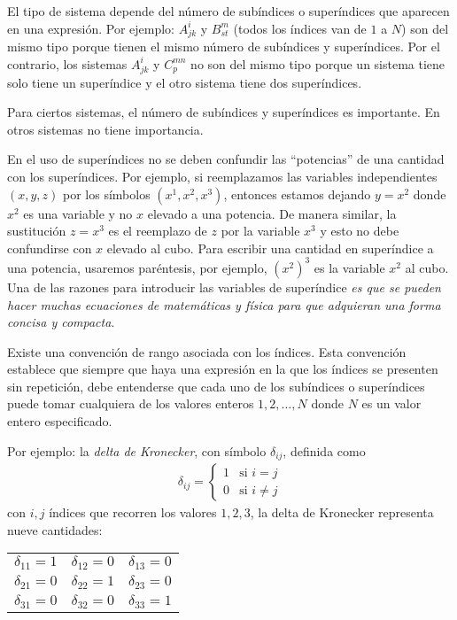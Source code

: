 \par
El tipo de sistema depende del número de subíndices o superíndices que aparecen en una expresión. Por ejemplo: $A_{jk}^{i}$ y $B_{st}^{m}$ (todos los índices van de $1$ a $N$) son del mismo tipo porque tienen el mismo número de subíndices y superíndices. Por el contrario, los sistemas $A_{jk}^{i}$ y $C_{p}^{mn}$ no son del mismo tipo porque un sistema tiene solo tiene un superíndice y el otro sistema tiene dos superíndices.
\par
Para ciertos sistemas, el número de subíndices y superíndices es importante. En otros sistemas no tiene importancia.
\par
En el uso de superíndices no se deben confundir las \enquote{potencias} de una cantidad con los superíndices. Por ejemplo, si reemplazamos las variables independientes $(x, y, z)$ por los símbolos $(x^{1}, x^{2}, x^{3})$, entonces estamos dejando $y = x^{2}$ donde $x^{2}$ es una variable y no $x$ elevado a una potencia. De manera similar, la sustitución $z = x^{3}$ es el reemplazo de $z$ por la variable $x^{3}$ y esto no debe confundirse con $x$ elevado al cubo. Para escribir una cantidad en superíndice a una potencia, usaremos paréntesis, por ejemplo, $(x^{2})^{3}$ es la variable $x^{2}$ al cubo. Una de las razones para introducir las variables de superíndice \emph{es que se pueden hacer muchas ecuaciones de matemáticas y física para que adquieran una forma concisa y compacta}.
\par
Existe una convención de rango asociada con los índices. Esta convención establece que siempre que haya una expresión en la que los índices se presenten sin repetición, debe entenderse que cada uno de los subíndices o superíndices puede tomar cualquiera de los valores enteros $1,2, \ldots, N$ donde $N$ es un valor entero especificado.
\par
Por ejemplo: la \emph{delta de Kronecker}, con símbolo $\delta_{ij}$, definida como
\begin{align*}
\delta_{ij} = \begin{cases}
1 & \mbox{si } i = j \\[0.5em]
0 & \mbox{si } i \neq j
\end{cases}
\end{align*}
con $i, j$ índices que recorren los valores $1, 2, 3$, la delta de Kronecker representa nueve cantidades:
\begin{table}[H]
\centering
\begin{tabular}{c c c}
$\delta_{11} = 1$ & $\delta_{12} = 0$ & $\delta_{13} = 0$ \\
$\delta_{21} = 0$ & $\delta_{22} = 1$ & $\delta_{23} = 0$ \\
$\delta_{31} = 0$ & $\delta_{32} = 0$ & $\delta_{33} = 1$
\end{tabular}
\end{table}
